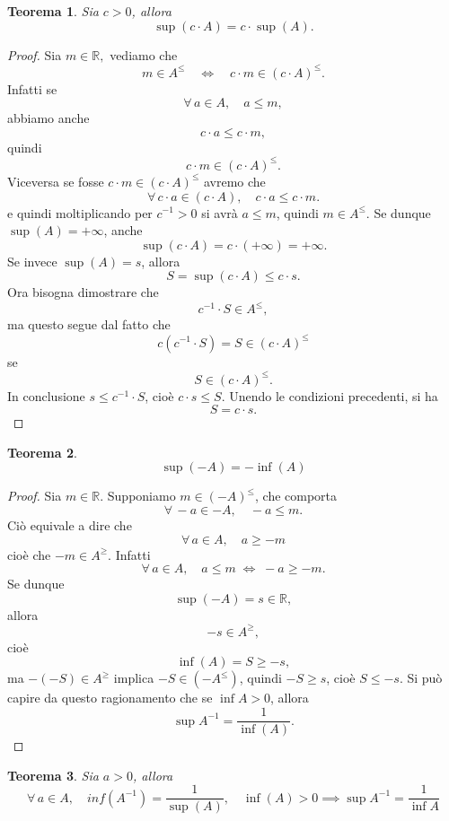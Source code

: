 \documentclass{article}
\theoremstyle{plain}
\newtheorem{thm}{Teorema}[section]
\theoremstyle{definition}
\theoremstyle{remark}
\begin{document}
\begin{bxthm}
\begin{thm}
    Sia $c>0$, allora 
    \[\sup(c\cdot A)=c\cdot\sup(A).\]
\end{thm}
\end{bxthm}
\begin{proof}
    Sia $m\in\mathbb{R},$ vediamo che 
    \[m\in A^\leq\quad\iff\quad c\cdot m\in(c\cdot A)^\leq.\]
    Infatti se 
    \[\forall\, a\in A,\quad a\leq m,\]
    abbiamo anche 
    \[c\cdot a \leq c\cdot m,\]
    quindi 
    \[c\cdot m\in (c\cdot A)^\leq.\]
    Viceversa se fosse $c\cdot m\in(c\cdot A)^\leq$ avremo che 
    \[\forall\, c\cdot a\in (c\cdot A),\quad c\cdot a\leq c\cdot m .\]
    e quindi moltiplicando per $c^{-1}>0$ si avrà $a\leq m$, quindi $m\in A^\leq$.
    Se dunque $\sup (A)=+\infty$, anche 
    \[\sup(c\cdot A)=c\cdot(+\infty)=+\infty.\]
    Se invece $\sup (A)=s$, allora 
    \[S=\sup(c\cdot A)\leq c\cdot s.\]
    Ora bisogna dimostrare che 
    \[c^{-1}\cdot S\in A^\leq,\]
    ma questo segue dal fatto che 
    \[c(c^{-1}\cdot S)=S\in (c\cdot A)^\leq\]
    se 
    \[S\in (c\cdot A)^\leq. \]
    In conclusione $s\leq c^{-1}\cdot S$, cioè $c\cdot s\leq S.$
    Unendo le condizioni precedenti, si ha \[S=c\cdot s.\]
\end{proof}

\vspace{10pt}

\begin{bxthm}
\begin{thm}
    \[\sup(-A)=-\inf(A)\]
\end{thm}
\end{bxthm}
\begin{proof}
    Sia $m\in\mathbb{R}$. Supponiamo $m\in(-A)^{\leq}$, che comporta \[\forall\,-a\in-A,\quad -a\leq m.\]
    Ciò equivale a dire che 
    \[\forall\,a\in A,\quad a\geq-m\] cioè che $-m\in A^\geq$.
    Infatti 
    \[\forall\, a\in A,\quad a\leq m\; \iff\; -a\geq -m.\]
    Se dunque 
    \[\sup(-A)=s\in\mathbb{R},\]
    allora 
    \[-s\in A^\geq, \]
    cioè 
    \[\inf(A) = S\geq -s,\]
    ma $-(-S)\in A^\geq$ implica $-S\in (-A^\leq)$, quindi $-S\geq s$, cioè $S\leq -s$.
    Si può capire da questo ragionamento che se $\inf A>0$, allora \[\sup A^{-1}=\dfrac{1}{\inf(A)}.\]
\end{proof}

\vspace{10pt}

\begin{bxthm}
\begin{thm}
    Sia $a>0$, allora
    \[\forall\, a\in A,\quad inf(A^{-1})=\frac{1}{\sup(A)},\quad \inf(A)>0\implies \sup A^{-1}=\frac{1}{\inf A}\]
\end{thm}
\end{bxthm}
\end{document}
